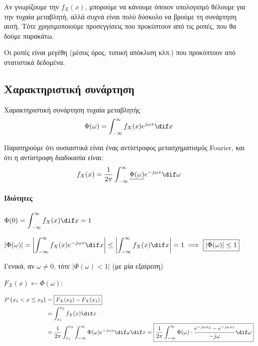 \documentclass[11pt,a4paper,notitlepage,fleqn,final]{article}
\begin{document}
Αν γνωρίζουμε την \( f_X(x) \), μπορούμε να κάνουμε όποιον
υπολογισμό θέλουμε για την τυχαία μεταβλητή, αλλά συχνά είναι
πολύ δύσκολο να βρούμε τη συνάρτηση αυτή. Τότε χρησιμοποιούμε
προσεγγίσεις που προκύπτουν από τις ροπές, που θα δούμε παρακάτω.

Οι ροπές είναι μεγέθη (μέσος όρος, τυπική απόκλιση κλπ.) που
προκύπτουν από στατιστικά δεδομένα.

\subsection{Χαρακτηριστική συνάρτηση}
\begin{defn}{Χαρακτηριστική συνάρτηση τυχαία μεταβλητής}{}
	\[
	\Phi(\omega ) = \int_{-\infty}^{\infty} f_X(x) e^{j\omega x}
	\dif x
	\]
\end{defn}
Παρατηρούμε ότι ουσιαστικά είναι ένας αντίστροφος μετασχηματισμός
Fourier, και ότι η αντίστροφη διαδικασία είναι:
\[
f_X(x) = \frac{1}{2\pi} \int_{-\infty}^{\infty}
\underline{\Phi(\omega )} e^{-j\omega x}\dif \omega
\]

\paragraph{Ιδιότητες}
\begin{enumpar}
	\item \( \displaystyle \Phi(0)
	= \int_{-\infty}^{\infty} f_X(x)\dif x = 1 \)
	\item \( \displaystyle \left| \Phi(\omega ) \right| = \left|
	\int_{-\infty}^{\infty} f_X(x) e^{-j\omega x}\dif x
	\right|
	\leq \left|\int_{-\infty}^{\infty} f_X(x)\dif x\right| = 1
	\implies \boxed{\left|\Phi(\omega )\right|\leq1}
	\)

	Γενικά, αν \( \omega \neq 0 \), τότε \( \left|
	\Phi(\omega ) < 1 \right|
	\) (με μία εξαίρεση)
	\item \( F_X(x) \leftarrow \Phi(\omega ) \):

	\begin{align*}
		P\left\lbrace x_1 < x \leq x_2 \right\rbrace
		&= \boxed{F_X(x_2) - F_X(x_1)}
		\\ &= \int_{x_1}^{x_2} f_X(x)\dif x
		\\ &= \frac{1}{2\pi} \int_{x_1}^{x_2}
		\int_{-\infty}^{\infty} \Phi(\omega )e^{-j\omega x}
		\dif \omega \dif x = \boxed{
			\frac{1}{2\pi} \int_{-\infty}^{\infty}
			\Phi(\omega) \cdot
			\frac{e^{-j\omega x_2}-e^{-j\omega x_1}}{-j\omega }
			\dif \omega
			}
	\end{align*}
\end{enumpar}
\end{document}
